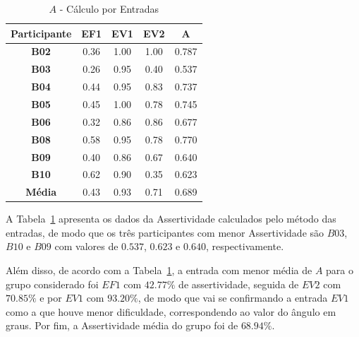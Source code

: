 \begin{table}[htbp]
	\centering
	\caption{$A$ - Cálculo por Entradas}
	\begin{tabular}{|c|c|c|c|c|}
		\hline
		\rowcolor[HTML]{D0CECE} 
		\textbf{Participante} & \textbf{EF1} & \textbf{EV1} & \textbf{EV2} & \textbf{A} \\ \hline
		\textbf{B02}          & 0.36         & 1.00         & 1.00         & 0.787      \\ \hline
		\rowcolor[HTML]{F2F2F2} 
		\textbf{B03}          & 0.26         & 0.95         & 0.40         & 0.537      \\ \hline
		\textbf{B04}          & 0.44         & 0.95         & 0.83         & 0.737      \\ \hline
		\rowcolor[HTML]{F2F2F2} 
		\textbf{B05}          & 0.45         & 1.00         & 0.78         & 0.745      \\ \hline
		\textbf{B06}          & 0.32         & 0.86         & 0.86         & 0.677      \\ \hline
		\rowcolor[HTML]{F2F2F2} 
		\textbf{B08}          & 0.58         & 0.95         & 0.78         & 0.770      \\ \hline
		\textbf{B09}          & 0.40         & 0.86         & 0.67         & 0.640      \\ \hline
		\rowcolor[HTML]{F2F2F2} 
		\textbf{B10}          & 0.62         & 0.90         & 0.35         & 0.623      \\ \hline
		\textbf{Média}        & 0.43         & 0.93         & 0.71         & 0.689      \\ \hline
	\end{tabular}	
	\label{tab:F3_A2_A_ENTRADAS}
\end{table}

A Tabela~\ref{tab:F3_A2_A_ENTRADAS} apresenta os dados da Assertividade calculados pelo método das entradas, de modo que os três participantes com menor Assertividade são $B03$, $B10$ e $B09$ com valores de $0.537$, $0.623$ e $0.640$, respectivamente.

Além disso, de acordo com a Tabela~\ref{tab:F3_A2_A_ENTRADAS}, a entrada com menor média de $A$ para o grupo considerado foi $EF1$ com $42.77\%$ de assertividade, seguida de $EV2$ com $70.85\%$ e por $EV1$ com $93.20\%$, de modo que vai se confirmando a entrada $EV1$ como a que houve menor dificuldade, correspondendo ao valor do ângulo em graus. Por fim, a Assertividade média do grupo foi de $68.94\%$.

